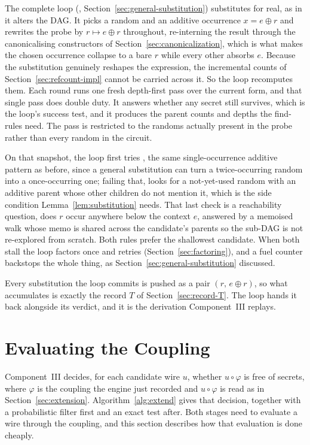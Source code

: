   The complete loop (, Section~\ref{sec:general-substitution})
  substitutes for real, as in it alters the DAG. It picks a random and an additive occurrence
  $x = e \oplus r$ and rewrites the probe by $r \mapsto e \oplus r$ throughout,
  re-interning the result through the canonicalising constructors of
  Section~\ref{sec:canonicalization}, which is what makes the chosen occurrence
  collapse to a bare $r$ while every other absorbs $e$. Because the substitution
  genuinely reshapes the expression, the incremental counts of
  Section~\ref{sec:refcount-impl} cannot be carried across it. So the loop recomputes them.
  Each round runs one fresh depth-first pass
  over the current form, and that single pass does double duty. It answers whether
  any secret still survives, which is the loop's success test, and it produces the
  parent counts and depths the find-rules need. The pass is restricted to the
  randoms actually present in the probe rather than every random in the circuit.

  On that snapshot, the loop first tries , the same
  single-occurrence additive pattern as before, since a general substitution can
  turn a twice-occurring random into a once-occurring one; failing that,
   looks for a not-yet-used random with an additive parent
  whose other children do not mention it, which is the side condition
  Lemma~\ref{lem:substitution} needs. That last check is a reachability question,
  does $r$ occur anywhere below the context $e$, answered by a memoised walk whose
  memo is shared across the candidate's parents so the sub-DAG is not re-explored
  from scratch. Both rules prefer the shallowest candidate. When both stall the
  loop factors once and retries (Section~\ref{sec:factoring}), and a fuel counter
  backstops the whole thing, as Section~\ref{sec:general-substitution} discussed.

  Every
  substitution the loop commits is pushed as a pair $(r,\, e \oplus r)$, so what
  accumulates is exactly the record $T$ of Section~\ref{sec:record-T}. The loop
  hands it back alongside its verdict, and it is the derivation Component~III
  replays.

\section{Evaluating the Coupling}
\label{sec:coupling-impl}

Component~III decides, for each candidate wire $u$, whether $u \circ \varphi$ is
free of secrets, where $\varphi$ is the coupling the engine just recorded and
$u \circ \varphi$ is read as in Section~\ref{sec:extension}. Algorithm~\ref{alg:extend} gives that
decision, together with a probabilistic filter first and an exact test after. Both stages
need to evaluate a wire through the coupling, and this section describes how that
evaluation is done cheaply.

